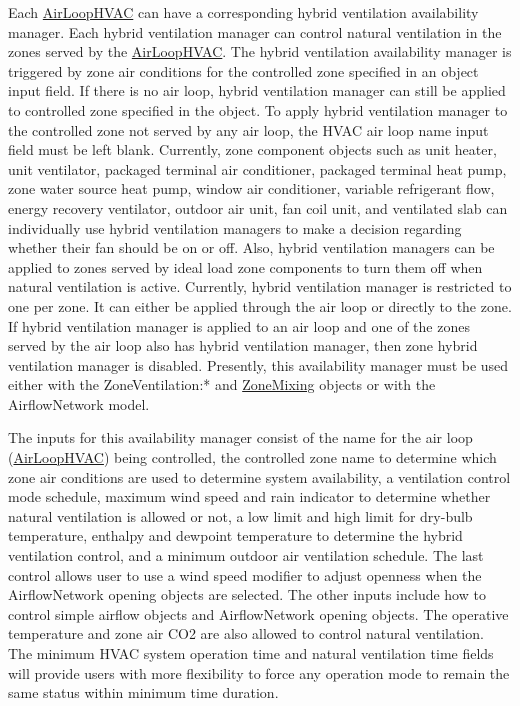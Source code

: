Each \hyperref[airloophvac]{AirLoopHVAC} can have a corresponding hybrid ventilation availability manager. Each hybrid ventilation manager can control natural ventilation in the zones served by the \hyperref[airloophvac]{AirLoopHVAC}. The hybrid ventilation availability manager is triggered by zone air conditions for the controlled zone specified in an object input field. If there is no air loop, hybrid ventilation manager can still be applied to controlled zone specified in the object. To apply hybrid ventilation manager to the controlled zone not served by any air loop, the HVAC air loop name input field must be left blank. Currently, zone component objects such as unit heater, unit ventilator, packaged terminal air conditioner, packaged terminal heat pump, zone water source heat pump, window air conditioner, variable refrigerant flow, energy recovery ventilator, outdoor air unit, fan coil unit, and ventilated slab can individually use hybrid ventilation managers to make a decision regarding whether their fan should be on or off. Also, hybrid ventilation managers can be applied to zones served by ideal load zone components to turn them off when natural ventilation is active. Currently, hybrid ventilation manager is restricted to one per zone. It can either be applied through the air loop or directly to the zone. If hybrid ventilation manager is applied to an air loop and one of the zones served by the air loop also has hybrid ventilation manager, then zone hybrid ventilation manager is disabled. Presently, this availability manager must be used either with the ZoneVentilation:* and \hyperref[zonemixing]{ZoneMixing} objects or with the AirflowNetwork model.

The inputs for this availability manager consist of the name for the air loop (\hyperref[airloophvac]{AirLoopHVAC}) being controlled, the controlled zone name to determine which zone air conditions are used to determine system availability, a ventilation control mode schedule, maximum wind speed and rain indicator to determine whether natural ventilation is allowed or not, a low limit and high limit for dry-bulb temperature, enthalpy and dewpoint temperature to determine the hybrid ventilation control, and a minimum outdoor air ventilation schedule. The last control allows user to use a wind speed modifier to adjust openness when the AirflowNetwork opening objects are selected. The other inputs include how to control simple airflow objects and AirflowNetwork opening objects. The operative temperature and zone air CO2 are also allowed to control natural ventilation. The minimum HVAC system operation time and natural ventilation time fields will provide users with more flexibility to force any operation mode to remain the same status within minimum time duration.


